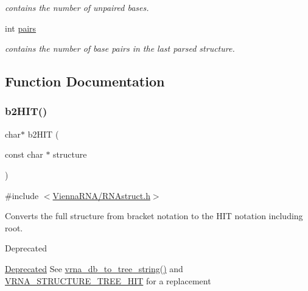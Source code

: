 \begin{DoxyCompactItemize}
\begin{DoxyCompactList}\small\item\em contains the number of unpaired bases. \end{DoxyCompactList}\item 
\mbox{\label{group__struct__utils__deprecated_ga6341cbb704924824e0236c1dce791032}} 
int \mbox{\hyperlink{group__struct__utils__deprecated_ga6341cbb704924824e0236c1dce791032}{pairs}}
\begin{DoxyCompactList}\small\item\em contains the number of base pairs in the last parsed structure. \end{DoxyCompactList}\end{DoxyCompactItemize}


\subsection{Function Documentation}
\mbox{\label{group__struct__utils__deprecated_ga07b7e90e712559a1992fba3ac6d21bbd}} 
\subsubsection{\texorpdfstring{b2HIT()}{b2HIT()}}
{\footnotesize\ttfamily char$\ast$ b2\+H\+IT (\begin{DoxyParamCaption}\item[{const char $\ast$}]{structure }\end{DoxyParamCaption})}



{\ttfamily \#include $<$\mbox{\hyperlink{RNAstruct_8h}{Vienna\+R\+N\+A/\+R\+N\+Astruct.\+h}}$>$}



Converts the full structure from bracket notation to the H\+IT notation including root. 

\begin{DoxyRefDesc}{Deprecated}
\item[\mbox{\hyperlink{deprecated__deprecated000128}{Deprecated}}]See \mbox{\hyperlink{group__struct__utils__tree_ga56551ab7da64933a7230d29430f40cfe}{vrna\+\_\+db\+\_\+to\+\_\+tree\+\_\+string()}} and \mbox{\hyperlink{group__struct__utils__tree_ga3ad5609bc93ef20034c3ab989365c1f0}{V\+R\+N\+A\+\_\+\+S\+T\+R\+U\+C\+T\+U\+R\+E\+\_\+\+T\+R\+E\+E\+\_\+\+H\+IT}} for a replacement\end{DoxyRefDesc}



